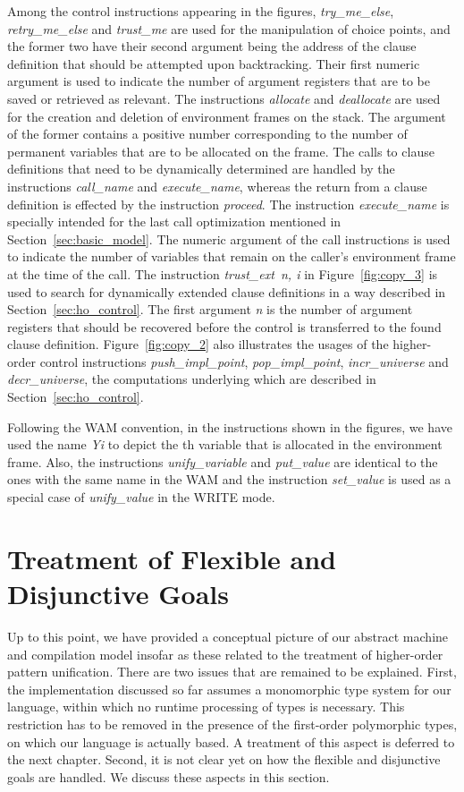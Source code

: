 Among the control instructions appearing in the figures,  {\it try\_me\_else},
{\it retry\_me\_else} and {\it trust\_me} are used for the manipulation
of choice points, and the former two have their second argument being
the address of the clause definition that should be attempted upon
backtracking.
Their first numeric argument is used to indicate the number of argument
registers that are to be saved or retrieved as relevant.
The instructions {\it allocate} and {\it deallocate} are used for the
creation and deletion of environment frames on the stack. The argument
of the former contains a positive number corresponding to the number of
permanent variables that are to be allocated on the frame.
The calls to clause definitions that need to be dynamically determined
are handled by the instructions
{\it call\_name} and {\it execute\_name}, whereas the return from a
clause definition is effected by the instruction
{\it proceed}. The instruction
{\it execute\_name} is specially intended for the last call optimization
mentioned
in Section~\ref{sec:basic_model}. The numeric argument of the call instructions
is used to indicate the number of variables that remain on the
caller's environment frame at the time of the call.
The instruction {\it trust\_ext\ n, i} in Figure~\ref{fig:copy_3} is used
to search for dynamically extended clause definitions in a way described in
Section~\ref{sec:ho_control}.
The first argument
{\it n} is the number of argument registers that should be recovered
before the control is transferred to the found clause definition.
Figure~\ref{fig:copy_2} also illustrates the usages of the higher-order
control instructions {\it push\_impl\_point}, {\it pop\_impl\_point},
{\it incr\_universe} and {\it decr\_universe},
the computations underlying which are described in
Section~\ref{sec:ho_control}.

Following the WAM convention, in the instructions shown in the
figures, we have used the name {\it Yi} to depict the th variable
that is allocated in the environment frame. Also, the instructions
{\it unify\_variable} and {\it put\_value} are identical to the ones
with the same name in the WAM and the instruction {\it set\_value}
is used as a special case of {\it unify\_value} in the WRITE mode.

\section{Treatment of Flexible and Disjunctive Goals}\label{sec:misc}
Up to this point, we have provided a conceptual picture of our
abstract machine and compilation model insofar as these related to
the treatment of higher-order pattern unification. There are two
issues that are remained to be explained. First, the implementation
discussed so far assumes a monomorphic type system for our language,
within which no runtime processing of types is necessary. This
restriction has to be removed in the presence of the first-order
polymorphic types, on which our language is actually based. A
treatment of this aspect is deferred to the next chapter. Second, it
is not clear yet on how the flexible and disjunctive goals are
handled. We discuss these aspects in this section.

